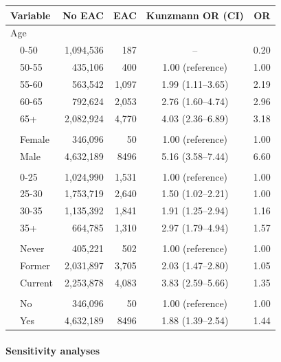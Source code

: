 \documentclass[12pt]{article}
\begin{document}
\begin{table}[h]
\begin{tabular}{llrrcc}
\toprule
\multicolumn{2}{l}{Variable} & No EAC & EAC & Kunzmann OR (CI) & OR\\
\midrule
\multicolumn{2}{l}{Age} &&&& \\
& 0-50 & 1,094,536 & 187 & -- &  0.20\\
& 50-55 & 435,106 & 400 & 1.00 (reference) & 1.00\\
& 55-60 & 563,542 & 1,097 & 1.99 (1.11--3.65) & 2.19\\
& 60-65 & 792,624 & 2,053 & 2.76 (1.60--4.74) & 2.96\\
& 65+ & 2,082,924 & 4,770 & 4.03 (2.36--6.89) & 3.18\\ \addlinespace
\multicolumn{2}{l}{Sex} &&&& \\
& Female & 346,096 & 50 & 1.00 (reference) & 1.00\\
& Male & 4,632,189 & 8496 & 5.16 (3.58--7.44) & 6.60\\ \addlinespace
\multicolumn{2}{l}{BMI} &&&& \\
& 0-25 & 1,024,990 & 1,531 & 1.00 (reference) & 1.00\\
& 25-30 & 1,753,719 & 2,640 & 1.50 (1.02--2.21) & 1.00\\
& 30-35 & 1,135,392 & 1,841 & 1.91 (1.25--2.94) & 1.16\\
& 35+ & 664,785 & 1,310 & 2.97 (1.79--4.94) & 1.57\\ \addlinespace
\multicolumn{2}{l}{Smoking} &&&& \\
& Never & 405,221 & 502 & 1.00 (reference) & 1.00\\
& Former & 2,031,897 & 3,705 & 2.03 (1.47--2.80) & 1.05\\
& Current & 2,253,878 & 4,083 & 3.83 (2.59--5.66) & 1.35\\ \addlinespace
\multicolumn{2}{l}{Esophagal condition} &&&& \\
& No & 346,096 & 50 & 1.00 (reference) & 1.00\\
& Yes & 4,632,189 & 8496 & 1.88 (1.39--2.54) & 1.44\\
\bottomrule
\end{tabular}
\end{table}


\paragraph*{Sensitivity analyses}
\end{document}
